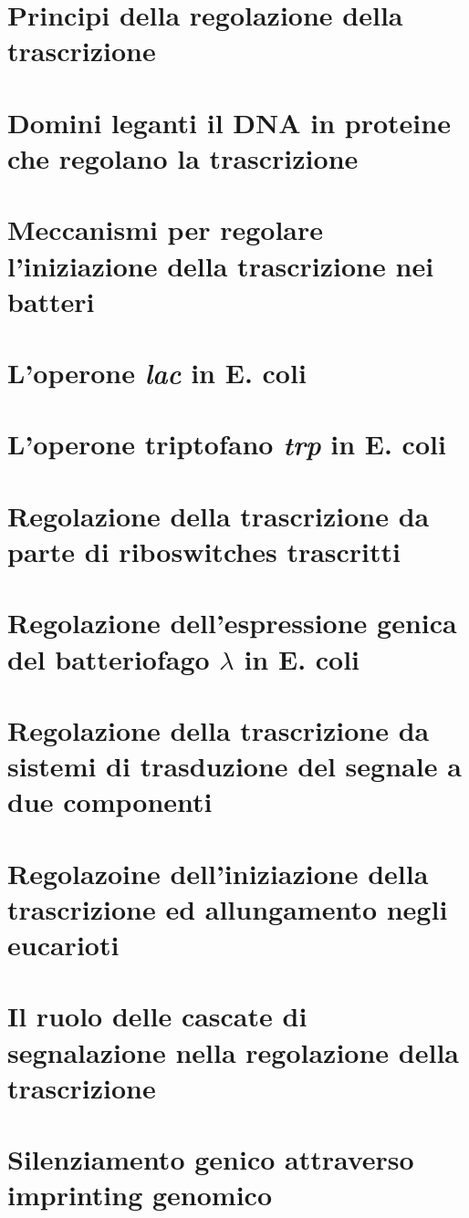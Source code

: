 \section{Principi della regolazione della trascrizione}

\section{Domini leganti il DNA in proteine che regolano la trascrizione}

\section{Meccanismi per regolare l'iniziazione della trascrizione nei batteri}

\section{L'operone \emph{lac} in E. coli}

\section{L'operone triptofano \emph{trp} in E. coli}

\section{Regolazione della trascrizione da parte di riboswitches trascritti}

\section{Regolazione dell'espressione genica del batteriofago $\lambda$ in E. coli}

\section{Regolazione della trascrizione da sistemi di trasduzione del segnale a due componenti}

\section{Regolazoine dell'iniziazione della trascrizione ed allungamento negli eucarioti}

\section{Il ruolo delle cascate di segnalazione nella regolazione della trascrizione}

\section{Silenziamento genico attraverso imprinting genomico}
